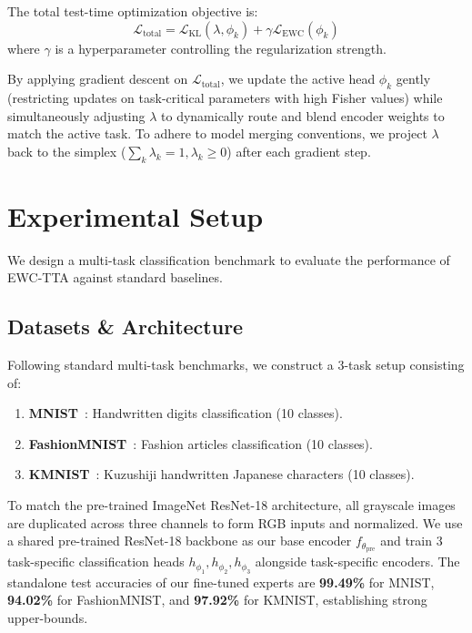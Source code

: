 \documentclass{article}
\theoremstyle{plain}
\theoremstyle{definition}
\theoremstyle{remark}
\begin{document}
The total test-time optimization objective is:
\begin{equation}
    \mathcal{L}_{\text{total}} = \mathcal{L}_{\text{KL}}(\lambda, \phi_k) + \gamma \mathcal{L}_{\text{EWC}}(\phi_k)
\end{equation}
where $\gamma$ is a hyperparameter controlling the regularization strength. 

By applying gradient descent on $\mathcal{L}_{\text{total}}$, we update the active head $\phi_k$ gently (restricting updates on task-critical parameters with high Fisher values) while simultaneously adjusting $\lambda$ to dynamically route and blend encoder weights to match the active task. To adhere to model merging conventions, we project $\lambda$ back to the simplex ($\sum_k \lambda_k = 1, \lambda_k \geq 0$) after each gradient step.

\section{Experimental Setup}
\label{submission-setup}

We design a multi-task classification benchmark to evaluate the performance of EWC-TTA against standard baselines.

\subsection{Datasets \& Architecture}
Following standard multi-task benchmarks, we construct a 3-task setup consisting of:
\begin{enumerate}
    \item \textbf{MNIST}~\citep{lecun1998gradient}: Handwritten digits classification (10 classes).
    \item \textbf{FashionMNIST}~\citep{xiao2017fashion}: Fashion articles classification (10 classes).
    \item \textbf{KMNIST}~\citep{clanuwat2018deep}: Kuzushiji handwritten Japanese characters (10 classes).
\end{enumerate}
To match the pre-trained ImageNet ResNet-18 architecture, all grayscale images are duplicated across three channels to form RGB inputs and normalized. We use a shared pre-trained ResNet-18 backbone as our base encoder $f_{\theta_{\text{pre}}}$ and train 3 task-specific classification heads $h_{\phi_1}, h_{\phi_2}, h_{\phi_3}$ alongside task-specific encoders. The standalone test accuracies of our fine-tuned experts are \textbf{99.49\%} for MNIST, \textbf{94.02\%} for FashionMNIST, and \textbf{97.92\%} for KMNIST, establishing strong upper-bounds.
\end{document}
